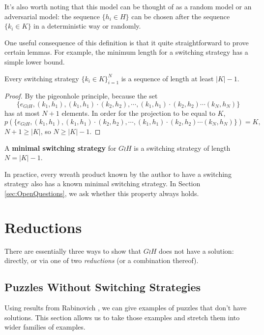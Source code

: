 It's also worth noting that this model can be thought of as a random model or an
adversarial model: the sequence $\{h_i \in H\}$ can be chosen after the sequence
$\{k_i \in K\}$ in a deterministic way or randomly.

One useful consequence of this definition is that it quite straightforward to
prove certain lemmas. For example, the minimum length for a switching strategy
has a simple lower bound.
\begin{lemma}
  Every switching strategy $\{k_i \in K\}_{i=1}^{N}$ is a sequence of
  length at least $|K| - 1$.
\end{lemma}
\begin{proof}
  By the pigeonhole principle, because the set \[
    \{e_{G \wr H}, (k_1, h_1), (k_1, h_1)\cdot(k_2, h_2), \cdots, (k_1, h_1)\cdot(k_2, h_2)\cdots(k_N, h_N)\}
  \] has at most $N+1$ elements. In order for the projection to be equal to $K$, \[
    p(\{e_{G \wr H}, (k_1, h_1), (k_1, h_1)\cdot(k_2, h_2), \cdots, (k_1, h_1)\cdot(k_2, h_2)\cdots(k_N, h_N)\}) = K,
  \] $N+1 \geq |K|$, so $N \geq |K| - 1$.
\end{proof}

\begin{definition}
  A \textbf{minimal switching strategy} for $G \wr H$ is a switching strategy
  of length $N = |K| - 1.$
\end{definition}

In practice, every wreath product known by the author to have a switching
strategy also has a known minimal switching strategy.
In Section \ref{sec:OpenQuestions}, we ask whether this property always holds.


\section{Reductions}
\label{sec:Reductions}
There are essentially three ways to show that $G \wr H$ does not have a
solution: directly, or via one of two \textit{reductions} (or a combination thereof).

\subsection{Puzzles Without Switching Strategies}
Using results from Rabinovich \cite{Rabinovich2022}, we can give examples of
puzzles that don't have solutions. This section allows us to take those examples
and stretch them into wider families of examples.

